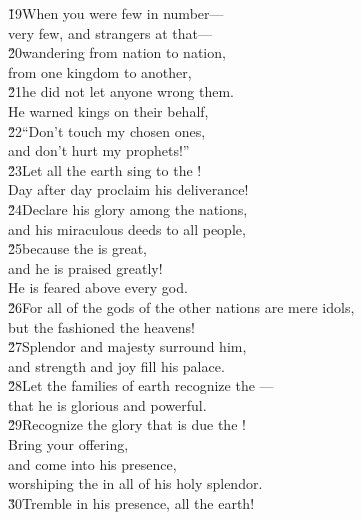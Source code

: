 \begin{poetry}
\poeml \v{19}When you were few in number--- \\
\poemll    very few, and strangers at that--- \\
\poeml \v{20}wandering from nation to nation, \\
\poemll    from one kingdom to another, \\
\poeml \v{21}he did not let anyone wrong them. \\
\poemll    He warned kings on their behalf, \\
\poeml \v{22}``Don't touch my chosen ones, \\
\poemll    and don't hurt my prophets!'' \\
\poeml \v{23}Let all the earth sing to the ! \\
\poemll    Day after day proclaim his deliverance! \\
\poeml \v{24}Declare his glory among the nations, \\
\poemll    and his miraculous deeds to all people, \\
\poeml \v{25}because the  is great, \\
\poemll    and he is praised greatly! \\
\poemlll       He is feared above every god. \\
\poeml \v{26}For all of the gods of the other nations are mere idols, \\
\poemll    but the  fashioned the heavens! \\
\poeml \v{27}Splendor and majesty surround him, \\
\poemll    and strength and joy fill his palace. \\
\poeml \v{28}Let the families of earth recognize the --- \\
\poemll    that he is glorious and powerful. \\
\poeml \v{29}Recognize the glory that is due the ! \\
\poemll    Bring your offering, \\
\poeml and come into his presence, \\
\poemll    worshiping the  in all of his holy splendor. \\
\poeml \v{30}Tremble in his presence, all the earth! \\

\end{poetry}
